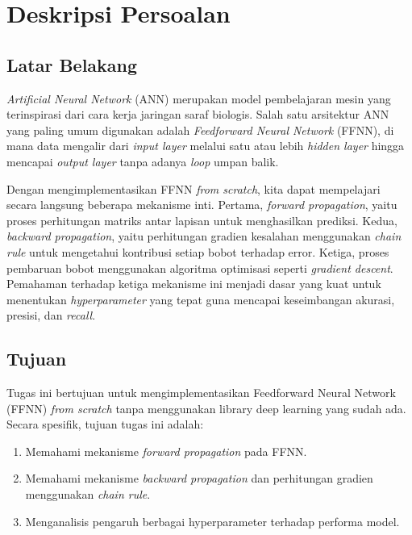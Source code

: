 
\chapter{Deskripsi Persoalan}

\section{Latar Belakang}
\textit{Artificial Neural Network} (ANN) merupakan model pembelajaran mesin yang terinspirasi dari cara kerja jaringan saraf biologis. Salah satu arsitektur ANN yang paling umum digunakan adalah \textit{Feedforward Neural Network} (FFNN), di mana data mengalir dari \textit{input layer} melalui satu atau lebih \textit{hidden layer} hingga mencapai \textit{output layer} tanpa adanya \textit{loop} umpan balik.

Dengan mengimplementasikan FFNN \textit{from scratch}, kita dapat mempelajari secara langsung beberapa mekanisme inti. Pertama, \textit{forward propagation}, yaitu proses perhitungan matriks antar lapisan untuk menghasilkan prediksi. Kedua, \textit{backward propagation}, yaitu perhitungan gradien kesalahan menggunakan \textit{chain rule} untuk mengetahui kontribusi setiap bobot terhadap error. Ketiga, proses pembaruan bobot menggunakan algoritma optimisasi seperti \textit{gradient descent}. Pemahaman terhadap ketiga mekanisme ini menjadi dasar yang kuat untuk menentukan \textit{hyperparameter} yang tepat guna mencapai keseimbangan akurasi, presisi, dan \textit{recall}.

\section{Tujuan}
Tugas ini bertujuan untuk mengimplementasikan Feedforward Neural Network (FFNN) \textit{from scratch} tanpa menggunakan library deep learning yang sudah ada. Secara spesifik, tujuan tugas ini adalah:

\begin{enumerate}
    \item Memahami mekanisme \textit{forward propagation} pada FFNN.
    \item Memahami mekanisme \textit{backward propagation} dan perhitungan gradien menggunakan \textit{chain rule}.
    \item Menganalisis pengaruh berbagai hyperparameter terhadap performa model.
\end{enumerate}

